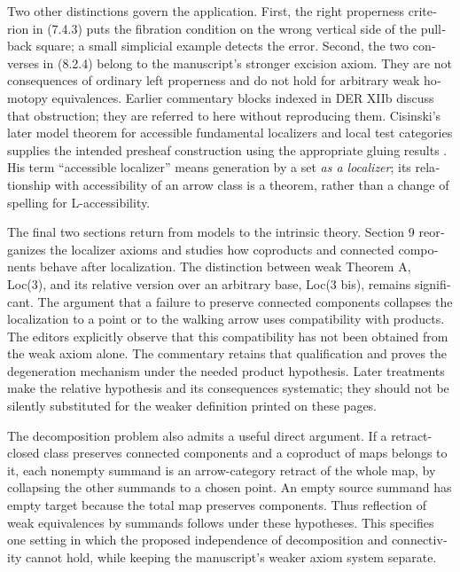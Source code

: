 \begin{otherlanguage}{english}
\begin{otherlanguage}{english}
Two other distinctions govern the application. First, the right properness criterion in (7.4.3) puts the fibration condition on the wrong vertical side of the pullback square; a small simplicial example detects the error. Second, the two converses in (8.2.4) belong to the manuscript's stronger excision axiom. They are not consequences of ordinary left properness and do not hold for arbitrary weak homotopy equivalences. Earlier commentary blocks indexed in DER XIIb discuss that obstruction; they are referred to here without reproducing them. Cisinski's later model theorem for accessible fundamental localizers and local test categories supplies the intended presheaf construction using the appropriate gluing results \citep[Corollary 4.2.18]{Cisinski2006}. His term “accessible localizer” means generation by a set \emph{as a localizer}; its relationship with accessibility of an arrow class is a theorem, rather than a change of spelling for L-accessibility.

The final two sections return from models to the intrinsic theory. Section 9 reorganizes the localizer axioms and studies how coproducts and connected components behave after localization. The distinction between weak Theorem A, Loc(3), and its relative version over an arbitrary base, Loc(3 bis), remains significant. The argument that a failure to preserve connected components collapses the localization to a point or to the walking arrow uses compatibility with products. The editors explicitly observe that this compatibility has not been obtained from the weak axiom alone. The commentary retains that qualification and proves the degeneration mechanism under the needed product hypothesis. Later treatments make the relative hypothesis and its consequences systematic; they should not be silently substituted for the weaker definition printed on these pages.

The decomposition problem also admits a useful direct argument. If a retract-closed class preserves connected components and a coproduct of maps belongs to it, each nonempty summand is an arrow-category retract of the whole map, by collapsing the other summands to a chosen point. An empty source summand has empty target because the total map preserves components. Thus reflection of weak equivalences by summands follows under these hypotheses. This specifies one setting in which the proposed independence of decomposition and connectivity cannot hold, while keeping the manuscript's weaker axiom system separate.


\end{otherlanguage}
\end{otherlanguage}
